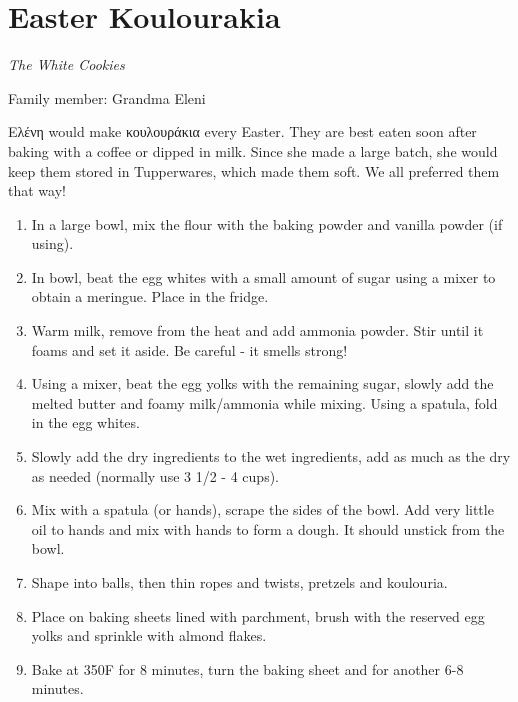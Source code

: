 \chapter{Easter Koulourakia}
\label{ch:easter_koulourakia}
\textit{The White Cookies}

Family member: Grandma Eleni


 \textgreek{Ελένη} would make \textgreek{κουλουράκια} every Easter. They are best eaten soon after baking with a coffee or dipped in milk. Since she made a large batch, she would keep them stored in Tupperwares, which made them soft. We all preferred them that way!


\begin{enumerate}
    \item In a large bowl, mix the flour with the baking powder and vanilla powder (if using).
    \item In bowl, beat the egg whites with a small amount of sugar using a mixer to obtain a meringue. Place in the fridge.
    \item Warm milk, remove from the heat and add ammonia powder. Stir until it foams and set it aside. Be careful - it smells strong!
    \item Using a mixer, beat the egg yolks with the remaining sugar, slowly add the melted butter and foamy milk/ammonia while mixing. Using a spatula, fold in the egg whites.
    \item Slowly add the dry ingredients to the wet ingredients, add as much as the dry as needed (normally use 3 1/2 - 4 cups).
    \item Mix with a spatula (or hands), scrape the sides of the bowl. Add very little oil to hands and mix with hands to form a dough. It should unstick from the bowl.
    \item Shape into balls, then thin ropes and twists, pretzels and koulouria.
    \item Place on baking sheets lined with parchment, brush with the reserved egg yolks and sprinkle with almond flakes.
    \item Bake at 350\degree F for 8 minutes, turn the baking sheet and for another 6-8 minutes.
\end{enumerate}

